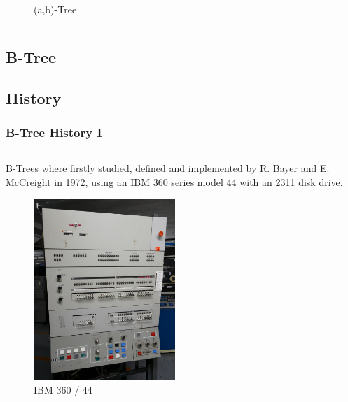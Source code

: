 \documentclass{beamer}
\begin{document}
\begin{frame}
\begin{columns}[T]
\begin{column}{.6\textwidth}
\begin{block}{}
\begin{figure}
                    \caption[]{(a,b)-Tree}
                    \label{ab_tree}
                \end{figure}
            \end{block}
        \end{column}
    \end{columns}    
\end{frame}
\begin{frame}
    \section{B-Tree}
    \subsection{History}
    \frametitle{B-Tree History I}
    \begin{columns}
        \begin{column}{0.5\textwidth}
            \begin{block}{}
                B-Trees where firstly studied, defined and implemented by R. Bayer and E. McCreight in 1972, using an IBM 360 series model 44 with an 2311 disk drive.
                \begin{figure}
                    \centering
                    \includegraphics[width=0.5\textwidth,height=\textheight,keepaspectratio]{resources/made/ibm360_44.png}
                    \caption[]{IBM 360 / 44}
                \end{figure}
            \end{block}
        \end{column}
        \begin{column}{0.5\textwidth}
            \begin{block}{}

\end{block}
\end{column}
\end{columns}
\end{frame}
\end{document}
